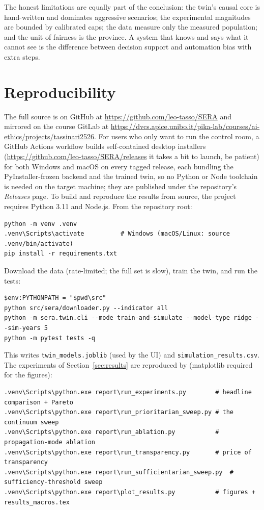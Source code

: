 \documentclass[11pt,a4paper]{article}
\newcommand{\code}[1]{\texttt{#1}}
\begin{document}
The honest limitations are equally part of the conclusion: the twin's causal
core is hand-written and dominates aggressive scenarios; the experimental
magnitudes are bounded by calibrated caps; the data measure only the measured
population; and the unit of fairness is the province. A system that knows and
says what it cannot see is the difference between decision support and
automation bias with extra steps.

\section{Reproducibility}
\label{sec:repro}

The full source is on GitHub at \url{https://github.com/leo-tasso/SERA} and
mirrored on the course GitLab at
\url{https://dvcs.apice.unibo.it/pika-lab/courses/ai-ethics/projects/tassinari2526}.
For users who only want to run the control room, a GitHub Actions workflow builds
self-contained desktop installers (\url{https://github.com/leo-tasso/SERA/releases} it takes a bit to launch, be patient) for both Windows and macOS on every tagged
release, each bundling the PyInstaller-frozen backend and the trained twin, so
no Python or Node toolchain is needed on the target machine; they are published
under the repository's \emph{Releases} page. To build and reproduce the results
from source, the project requires Python 3.11 and Node.js. From the repository
root:

{\footnotesize
\begin{verbatim}
python -m venv .venv
.venv\Scripts\activate          # Windows (macOS/Linux: source .venv/bin/activate)
pip install -r requirements.txt
\end{verbatim}
}

Download the data (rate-limited; the full set is slow), train the twin, and run
the tests:

{\footnotesize
\begin{verbatim}
$env:PYTHONPATH = "$pwd\src"
python src/sera/downloader.py --indicator all
python -m sera.twin.cli --mode train-and-simulate --model-type ridge --sim-years 5
python -m pytest tests -q
\end{verbatim}
}

This writes \code{twin\_models.joblib} (used by the UI) and
\code{simulation\_results.csv}. The experiments of Section~\ref{sec:results}
are reproduced by (matplotlib required for the figures):

{\footnotesize
\begin{verbatim}
.venv\Scripts\python.exe report\run_experiments.py        # headline comparison + Pareto
.venv\Scripts\python.exe report\run_prioritarian_sweep.py # the continuum sweep
.venv\Scripts\python.exe report\run_ablation.py           # propagation-mode ablation
.venv\Scripts\python.exe report\run_transparency.py       # price of transparency
.venv\Scripts\python.exe report\run_sufficientarian_sweep.py  # sufficiency-threshold sweep
.venv\Scripts\python.exe report\plot_results.py           # figures + results_macros.tex
\end{verbatim}
}
\end{document}
